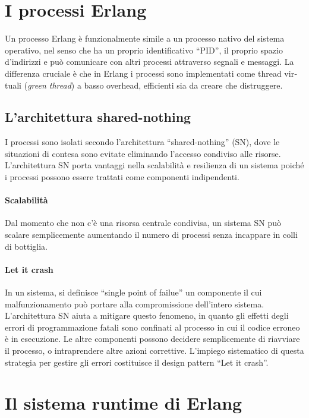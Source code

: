 \documentclass[target=bach,aauheader=,style=]{thud}
\newcommand{\eng}[1]{\foreignlanguage{english}{#1}}
\begin{document}
\section{I processi Erlang}

Un processo Erlang è funzionalmente simile a un processo nativo del sistema operativo, nel senso che ha un proprio identificativo ``PID'', il proprio spazio d'indirizzi e può comunicare con altri processi attraverso segnali e messaggi. La differenza cruciale è che in Erlang i processi sono implementati come \eng{thread virtuali} (\emph{\eng{green thread}}) a basso \eng{overhead}, efficienti sia da creare che distruggere.

\subsection{L'architettura \eng{shared-nothing}}

I processi sono isolati secondo l'architettura ``\eng{shared-nothing}'' (SN), dove le situazioni di contesa sono evitate eliminando l'accesso condiviso alle risorse. L'architettura SN porta vantaggi nella scalabilità e resilienza di un sistema poiché i processi possono essere trattati come componenti indipendenti.

\paragraph{Scalabilità}
Dal momento che non c'è una risorsa centrale condivisa, un sistema SN può scalare semplicemente aumentando il numero di processi senza incappare in colli di bottiglia.

\paragraph{\eng{Let it crash}}\label{erl:crash}
In un sistema, si definisce ``\eng{single point of failue}'' un componente il cui malfunzionamento può portare alla compromissione dell'intero sistema. L'architettura SN aiuta a mitigare questo fenomeno, in quanto gli effetti degli errori di programmazione fatali sono confinati al processo in cui il codice erroneo è in esecuzione. Le altre componenti possono decidere semplicemente di riavviare il processo, o intraprendere altre azioni correttive. L'impiego sistematico di questa strategia per gestire gli errori costituisce il design pattern ``\eng{Let it crash}''.

\section{Il sistema \eng{runtime} di Erlang}
\end{document}
